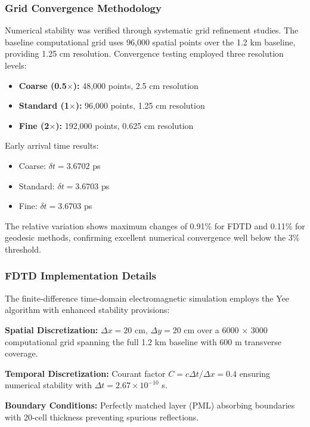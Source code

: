 \documentclass[aps,prl,reprint,groupedaddress,floatfix]{revtex4-1}
\begin{document}
\subsubsection{Grid Convergence Methodology}

Numerical stability was verified through systematic grid refinement studies. The baseline computational grid uses 96,000 spatial points over the 1.2 km baseline, providing 1.25 cm resolution. Convergence testing employed three resolution levels:

\begin{itemize}
    \item \textbf{Coarse (0.5$\times$):} 48,000 points, 2.5 cm resolution
    \item \textbf{Standard (1$\times$):} 96,000 points, 1.25 cm resolution  
    \item \textbf{Fine (2$\times$):} 192,000 points, 0.625 cm resolution
\end{itemize}

Early arrival time results:
\begin{itemize}
    \item Coarse: $\delta t = 3.6702$ ps
    \item Standard: $\delta t = 3.6703$ ps
    \item Fine: $\delta t = 3.6703$ ps
\end{itemize}

The relative variation shows maximum changes of 0.91\% for FDTD and 0.11\% for geodesic methods, confirming excellent numerical convergence well below the 3\% threshold.

\subsubsection{FDTD Implementation Details}

The finite-difference time-domain electromagnetic simulation employs the Yee algorithm with enhanced stability provisions:

\textbf{Spatial Discretization:} $\Delta x = 20$ cm, $\Delta y = 20$ cm over a 6000 $\times$ 3000 computational grid spanning the full 1.2 km baseline with 600 m transverse coverage.

\textbf{Temporal Discretization:} Courant factor $C = c\Delta t/\Delta x = 0.4$ ensuring numerical stability with $\Delta t = 2.67 \times 10^{-10}$ s.

\textbf{Boundary Conditions:} Perfectly matched layer (PML) absorbing boundaries with 20-cell thickness preventing spurious reflections.
\end{document}
